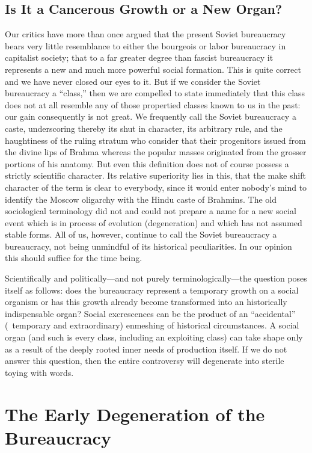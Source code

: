 \subsection*{Is It a Cancerous Growth or a New Organ?}

Our critics have more than once argued that the present Soviet bureaucracy bears very little resemblance to either the bourgeois or labor bureaucracy in capitalist society; that to a far greater degree than fascist bureaucracy it represents a new and much more powerful social formation. This is quite correct and we have never closed our eyes to it. But if we consider the Soviet bureaucracy a “class,” then we are compelled to state immediately that this class does not at all resemble any of those propertied classes known to us in the past: our gain consequently is not great. We frequently call the Soviet bureaucracy a caste, underscoring thereby its shut in character, its arbitrary rule, and the haughtiness of the ruling stratum who consider that their progenitors issued from the divine lips of Brahma whereas the popular masses originated from the grosser portions of his anatomy. But even this definition does not of course possess a strictly scientific character. Its relative superiority lies in this, that the make shift character of the term is clear to everybody, since it would enter nobody’s mind to identify the Moscow oligarchy with the Hindu caste of Brahmins. The old sociological terminology did not and could not prepare a name for a new social event which is in process of evolution (degeneration) and which has not assumed stable forms. All of us, however, continue to call the Soviet bureaucracy a bureaucracy, not being unmindful of its historical peculiarities. In our opinion this should suffice for the time being.

Scientifically and politically---and not purely terminologically---the question poses itself as follows: does the bureaucracy represent a temporary growth on a social organism or has this growth already become transformed into an historically indispensable organ? Social excrescences can be the product of an “accidental” (\ie\ temporary and extraordinary) enmeshing of historical circumstances. A social organ (and such is every class, including an exploiting class) can take shape only as a result of the deeply rooted inner needs of production itself. If we do not answer this question, then the entire controversy will degenerate into sterile toying with words.
\noclub

\section*{The Early Degeneration of the Bureaucracy}

